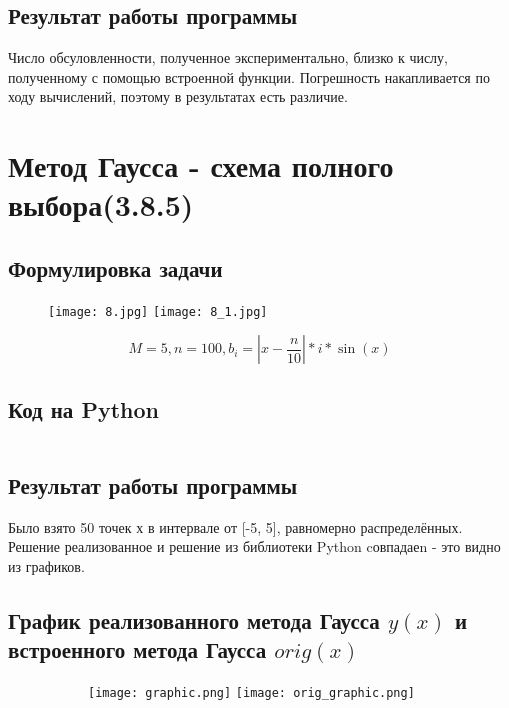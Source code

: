 \documentclass[a4paper,12pt]{article}
\newenvironment{longlisting}{\captionsetup{type=listing}}{}
\begin{document}
\subsection{Результат работы программы}
\begin{longlisting}

\end{longlisting}

Число обсуловленности, полученное экспериментально, близко к числу, полученному с помощью встроенной функции. Погрешность накапливается по ходу вычислений, поэтому в результатах есть различие.

\section{Метод Гаусса - схема полного выбора(3.8.5)}
\subsection{Формулировка задачи}
\begin{figure}[H]
\centering
  \texttt{[image: 8.jpg]}
  \texttt{[image: 8\_1.jpg]}
\end{figure}
$$M=5, n=100, b_i=| x - \frac{n}{10}|*i*\sin{(x)}$$
\subsection{Код на Python}

\begin{longlisting}
\inputminted{python}{gauss.py}
\end{longlisting}

\subsection{Результат работы программы}
Было взято 50 точек х в интервале от [-5, 5], равномерно распределённых.
Решение реализованное и решение из библиотеки Python cовпадаеn - это видно из графиков.
\subsection{График реализованного метода Гаусса $y(x)$ и встроенного метода Гаусса $orig(x)$}
\begin{figure}[H]
\centering
\begin{subfigure}{.5\textwidth}
  \centering
  \texttt{[image: graphic.png]}
  \texttt{[image: orig\_graphic.png]}
  \label{fig:sub1}
\end{subfigure}%
\label{fig:test}
\end{figure}
\end{document}
